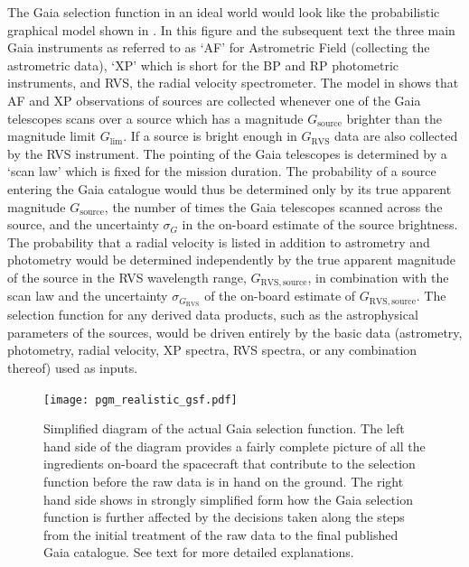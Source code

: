The Gaia selection function in an ideal world would look like the probabilistic graphical model shown in . In this figure and the subsequent text the three main Gaia instruments as referred to as `AF' for Astrometric Field (collecting the astrometric data), `XP' which is short for the BP and RP photometric instruments, and RVS, the radial velocity spectrometer. The model in  shows that AF and XP observations of sources are collected whenever one of the Gaia telescopes scans over a source which has a magnitude $G_\mathrm{source}$ brighter than the magnitude limit $G_\mathrm{lim}$. If a source is bright enough in $G_\mathrm{RVS}$ data are also collected by the RVS instrument. The pointing of the Gaia telescopes is determined by a `scan law' which is fixed for the mission duration. The probability of a source entering the Gaia catalogue would thus be determined only by its true apparent magnitude $G_\mathrm{source}$, the number of times the Gaia telescopes scanned across the source, and the uncertainty $\sigma_G$ in the on-board estimate of the source brightness. The probability that a radial velocity is listed in addition to astrometry and photometry would be determined independently by the true apparent magnitude of the source in the RVS wavelength range, $G_\mathrm{RVS,source}$, in combination with the scan law and the uncertainty $\sigma_{G_\mathrm{RVS}}$ of the on-board estimate of $G_\mathrm{RVS,source}$. The selection function for any derived data products, such as the astrophysical parameters of the sources, would be driven entirely by the basic data (astrometry, photometry, radial velocity, XP spectra, RVS spectra, or any combination thereof) used as inputs.

\begin{figure}[t]
    \centering
    \texttt{[image: pgm\_realistic\_gsf.pdf]}
    \caption{Simplified diagram of the actual Gaia selection function. The left hand side of the diagram provides a fairly complete picture of all the ingredients on-board the spacecraft that contribute to the selection function before the raw data is in hand on the ground. The right hand side shows in strongly simplified form how the Gaia selection function is further affected by the decisions taken along the steps from the initial treatment of the raw data to the final published Gaia catalogue. See text for more detailed explanations.}
    \label{fig:gsf_realistic}
\end{figure}

